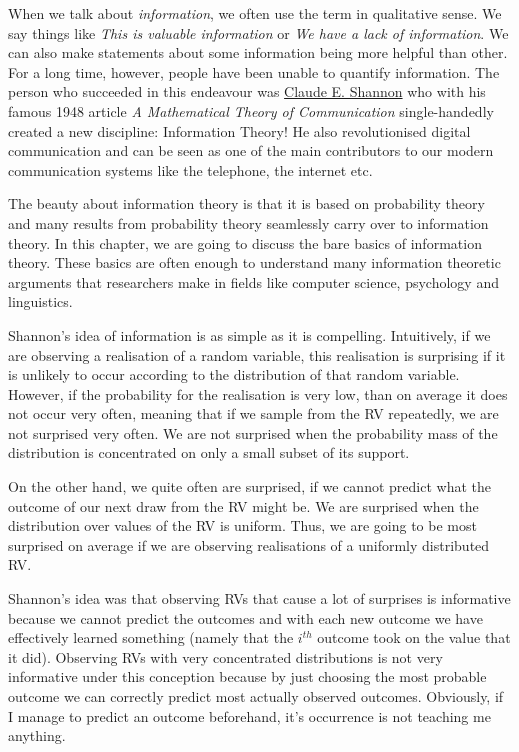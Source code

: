 When we talk about \textit{information}, we often use the term in qualitative sense. We say things like 
\textit{This is valuable information} or 
\textit{We have a lack of information}. We can also make statements about some information being more helpful than other. For a long time, however,
people have been unable to quantify information. The person who succeeded in this endeavour was \href{https://en.wikipedia.org/wiki/Claude_Shannon}{Claude E. Shannon}
who with his famous 1948 article \textit{A Mathematical Theory of Communication} single-handedly created a new discipline: Information Theory! He also revolutionised
digital communication and can be seen as one of the main contributors to our modern communication systems like the telephone, the internet etc. 

The beauty about information theory is that it is based on probability theory and many results from probability theory seamlessly carry over to information theory.
In this chapter, we are going to discuss the bare basics of information theory. These basics are often enough to understand many information theoretic arguments
that researchers make in fields like computer science, psychology and linguistics.

Shannon's idea of information is as simple as it is compelling. Intuitively, if we are observing a realisation of a random variable, this realisation is surprising
if it is unlikely to occur according to the distribution of that random variable. However, if the probability for the realisation is very low, than on average it
does not occur very often, meaning that if we sample from the RV repeatedly, we are not surprised very often. We are not surprised when the probability
mass of the distribution is concentrated on only a small subset of its support. 

On the other hand, we quite often are surprised,
if we cannot predict what the outcome of our next draw from the RV might be. We are surprised when the distribution over values of the RV is uniform. Thus,
we are going to be most surprised on average if we are observing realisations of a uniformly distributed RV.

Shannon's idea was that observing RVs that cause a lot of surprises is informative because we cannot predict the outcomes and with each new outcome we have effectively
learned something  (namely that the $ i^{th} $ outcome took on the value that it did). Observing RVs with very concentrated distributions is not very informative
under this conception because by just choosing the most probable outcome we can correctly predict most actually observed outcomes. Obviously, if I manage to predict
an outcome beforehand, it's occurrence is not teaching me anything.

